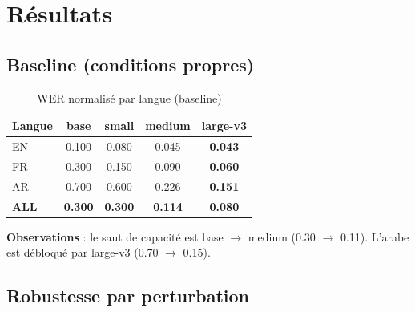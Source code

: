 \documentclass[11pt,a4paper]{article}
\begin{document}
\section{Résultats}
\label{sec:results}

\subsection{Baseline (conditions propres)}

\begin{table}[h]
\centering
\caption{WER normalisé par langue (baseline)}
\label{tab:baseline}
\begin{tabular}{lcccc}
\toprule
\textbf{Langue} & \textbf{base} & \textbf{small} & \textbf{medium} & \textbf{large-v3} \\
\midrule
EN & 0.100 & 0.080 & 0.045 & \textbf{0.043} \\
FR & 0.300 & 0.150 & 0.090 & \textbf{0.060} \\
AR & 0.700 & 0.600 & 0.226 & \textbf{0.151} \\
\midrule
\textbf{ALL} & \textbf{0.300} & \textbf{0.300} & \textbf{0.114} & \textbf{0.080} \\
\bottomrule
\end{tabular}
\end{table}

\textbf{Observations} : le saut de capacité est base $\to$ medium
(0.30 $\to$ 0.11). L'arabe est débloqué par large-v3 (0.70 $\to$ 0.15).

\subsection{Robustesse par perturbation}
\end{document}
